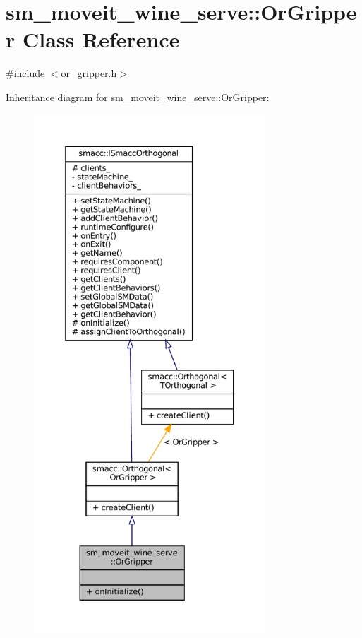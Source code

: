 \hypertarget{classsm__moveit__wine__serve_1_1OrGripper}{}\section{sm\+\_\+moveit\+\_\+wine\+\_\+serve\+:\+:Or\+Gripper Class Reference}
\label{classsm__moveit__wine__serve_1_1OrGripper}


{\ttfamily \#include $<$or\+\_\+gripper.\+h$>$}



Inheritance diagram for sm\+\_\+moveit\+\_\+wine\+\_\+serve\+:\+:Or\+Gripper\+:
\nopagebreak
\begin{figure}[H]
\begin{center}
\leavevmode
\includegraphics[height=550pt]{classsm__moveit__wine__serve_1_1OrGripper__inherit__graph}
\end{center}
\end{figure}


